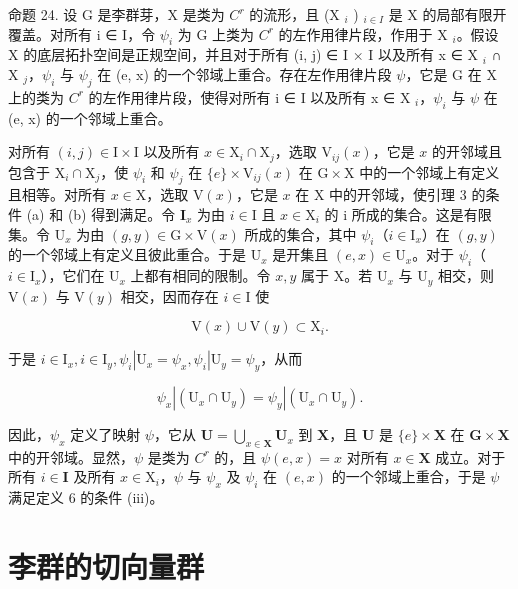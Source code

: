 命题 24. 设 G 是李群芽，X 是类为 \(C^{r}\) 的流形，且 (X \(_{i}\) ) \(_{i \in I}\) 是 X 的局部有限开覆盖。对所有 i ∈ I，令 \(\psi_{i}\) 为 G 上类为 \(C^{r}\) 的左作用律片段，作用于 X \(_{i}\)。假设 X 的底层拓扑空间是正规空间，并且对于所有 (i, j) ∈ I × I 以及所有 x ∈ X \(_{i}\) ∩ X \(_{j}\)，\(\psi_{i}\) 与 \(\psi_{j}\) 在 (e, x) 的一个邻域上重合。存在左作用律片段 \(\psi\)，它是 G 在 X 上的类为 \(C^{r}\) 的左作用律片段，使得对所有 i ∈ I 以及所有 x ∈ X \(_{i}\)，\(\psi_{i}\) 与 \(\psi\) 在 (e, x) 的一个邻域上重合。

对所有 \((i,j)\in \mathrm{I}\times \mathrm{I}\) 以及所有 \(x\in \mathrm{X}_i\cap \mathrm{X}_j\)，选取 \(\mathrm{V}_{ij}(x)\)，它是 \(x\) 的开邻域且包含于 \(\mathrm{X}_i\cap \mathrm{X}_j\)，使 \(\psi_i\) 和 \(\psi_j\) 在 \(\{e\} \times \mathrm{V}_{ij}(x)\) 在 \(\mathrm{G}\times \mathrm{X}\) 中的一个邻域上有定义且相等。对所有 \(x\in \mathrm{X}\)，选取 \(\mathrm{V}(x)\)，它是 \(x\) 在 \(\mathrm{X}\) 中的开邻域，使引理 3 的条件 (a) 和 (b) 得到满足。令 \(\mathbf{I}_x\) 为由 \(i\in \mathrm{I}\) 且 \(x\in \mathrm{X}_i\) 的 i 所成的集合。这是有限集。令 \(\mathrm{U}_x\) 为由 \((g,y)\in \mathrm{G}\times \mathrm{V}(x)\) 所成的集合，其中 \(\psi_i\)（\(i\in \mathrm{I}_x\)）在 \((g,y)\) 的一个邻域上有定义且彼此重合。于是 \(\mathrm{U}_x\) 是开集且 \((e,x)\in \mathrm{U}_x\)。对于 \(\psi_i\)（\(i\in \mathrm{I}_x\)），它们在 \(\mathrm{U}_x\) 上都有相同的限制。令 \(x,y\) 属于 \(\mathrm{X}\)。若 \(\mathrm{U}_x\) 与 \(\mathrm{U}_y\) 相交，则 \(\mathrm{V}(x)\) 与 \(\mathrm{V}(y)\) 相交，因而存在 \(i\in \mathrm{I}\) 使

\[
\mathrm{V} (x) \cup \mathrm{V} (y) \subset \mathrm{X} _ {i}.
\]

于是 \(i \in \mathrm{I}_x, i \in \mathrm{I}_y, \psi_i | \mathrm{U}_x = \psi_x, \psi_i | \mathrm{U}_y = \psi_y\)，从而

\[
\psi_ {x} | (\mathrm{U} _ {x} \cap \mathrm{U} _ {y}) = \psi_ {y} | (\mathrm{U} _ {x} \cap \mathrm{U} _ {y}).
\]

因此，\(\psi_x\) 定义了映射 \(\psi\)，它从 \(\mathbf{U} = \bigcup_{x\in \mathbf{X}}\mathbf{U}_x\) 到 \(\mathbf{X}\)，且 \(\mathbf{U}\) 是 \(\{e\} \times \mathbf{X}\) 在 \(\mathbf{G}\times \mathbf{X}\) 中的开邻域。显然，\(\psi\) 是类为 \(C^r\) 的，且 \(\psi (e,x) = x\) 对所有 \(x\in \mathbf{X}\) 成立。对于所有 \(i\in \mathbf{I}\) 及所有 \(x\in \mathrm{X}_i\)，\(\psi\) 与 \(\psi_x\) 及 \(\psi_i\) 在 \((e,x)\) 的一个邻域上重合，于是 \(\psi\) 满足定义 6 的条件 (iii)。

\section{李群的切向量群}

